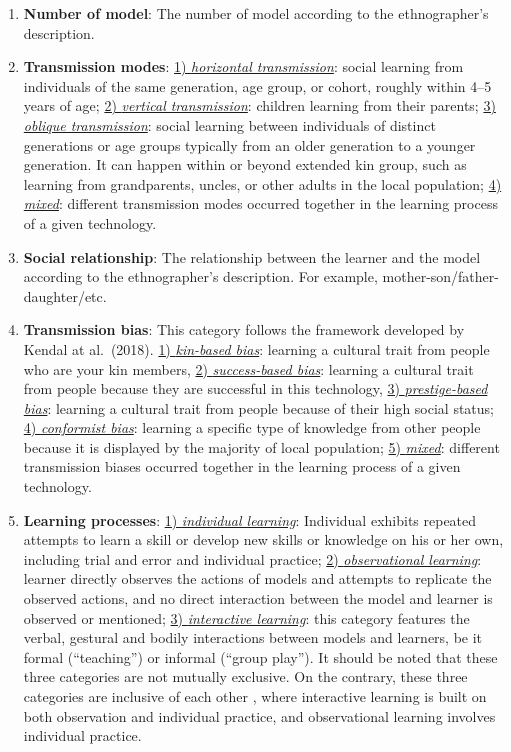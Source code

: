 \documentclass[
  11pt,
]{article}
\begin{document}
\begin{enumerate}
\item
  \textbf{Number of model}: The number of model according to the ethnographer's description.
\item
  \textbf{Transmission modes}: \ul{1) \emph{horizontal transmission}}: social learning from individuals of the same generation, age group, or cohort, roughly within 4--5 years of age; \ul{2) \emph{vertical transmission}}: children learning from their parents; \ul{3) \emph{oblique transmission}}: social learning between individuals of distinct generations or age groups typically from an older generation to a younger generation. It can happen within or beyond extended kin group, such as learning from grandparents, uncles, or other adults in the local population; \ul{4) \emph{mixed}}: different transmission modes occurred together in the learning process of a given technology.
\item
  \textbf{Social relationship}: The relationship between the learner and the model according to the ethnographer's description. For example, mother-son/father-daughter/etc.
\item
  \textbf{Transmission bias}: This category follows the framework developed by Kendal at al.~(2018). \ul{1) \emph{kin-based bias}}: learning a cultural trait from people who are your kin members, \ul{2) \emph{success-based bias}}: learning a cultural trait from people because they are successful in this technology, \ul{3) \emph{prestige-based bias}}: learning a cultural trait from people because of their high social status; \ul{4) \emph{conformist bias}}: learning a specific type of knowledge from other people because it is displayed by the majority of local population; \ul{5) \emph{mixed}}: different transmission biases occurred together in the learning process of a given technology.
\item
  \textbf{Learning processes}: \ul{1) \emph{individual learning}}: Individual exhibits repeated attempts to learn a skill or develop new skills or knowledge on his or her own, including trial and error and individual practice; \ul{2) \emph{observational learning}}: learner directly observes the actions of models and attempts to replicate the observed actions, and no direct interaction between the model and learner is observed or mentioned; \ul{3) \emph{interactive learning}}: this category features the verbal, gestural and bodily interactions between models and learners, be it formal (``teaching'') or informal (``group play''). It should be noted that these three categories are not mutually exclusive. On the contrary, these three categories are inclusive of each other , where interactive learning is built on both observation and individual practice, and observational learning involves individual practice.

\end{enumerate}
\end{document}
